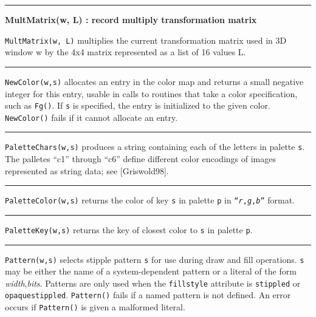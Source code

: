 \bigskip\hrule\vspace{0.1cm}
\noindent
{\bf MultMatrix(w, L) : record \hfill multiply transformation matrix}

\noindent
\texttt{MultMatrix(w, L)} multiplies the current transformation matrix
used in 3D window w by the 4x4 matrix represented as a list of 16
values L.

\bigskip\hrule\vspace{0.1cm}

\noindent
\texttt{NewColor(w,s)} allocates an entry in the color map and returns a
small negative integer for this entry, usable in calls to routines that
take a color specification, such as \texttt{Fg()}. If \texttt{s} is
specified, the entry is initialized to the given color.
\texttt{NewColor()} fails if it cannot allocate an entry.

\bigskip\hrule\vspace{0.1cm}

\noindent
\texttt{PaletteChars(w,s)} produces a string containing each of the
letters in palette \texttt{s}. The palletes
{\textquotedblleft}c1{\textquotedblright} through
{\textquotedblleft}c6{\textquotedblright} define different color
encodings of images represented as string data; see [Griswold98].

\bigskip\hrule\vspace{0.1cm}

\noindent
\texttt{PaletteColor(w,s)} returns the color of key \texttt{s} in
palette \texttt{p} in
\texttt{{\textquotedblleft}}\texttt{\textit{r}}\texttt{,}\texttt{\textit{g}}\texttt{,}\texttt{\textit{b}}\texttt{{\textquotedblright}}
format.

\bigskip\hrule\vspace{0.1cm}

\noindent
\texttt{PaletteKey(w,s)} returns the key of closest color to \texttt{s}
in palette \texttt{p}.

\bigskip\hrule\vspace{0.1cm}

\noindent
\texttt{Pattern(w,s)} selects stipple pattern \texttt{s} for use during
draw and fill operations. \texttt{s} may be either the name of a
system-dependent pattern or a literal of the form
\textit{width},\textit{bits}. Patterns are only used when the
\texttt{fillstyle} attribute is \texttt{stippled} or
\texttt{opaquestippled}. \texttt{Pattern()} fails if a named pattern
is not defined. An error occurs if \texttt{Pattern()} is given a
malformed literal.

